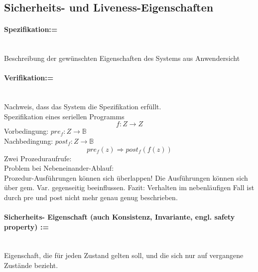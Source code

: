 \documentclass[a4paper,12pt]{scrartcl}
\begin{document}
 \subsection{Sicherheits- und Liveness-Eigenschaften}
 
 \paragraph{Spezifikation:=}\quad\\
 Beschreibung der gewünschten Eigenschaften des Systems aus Anwendersicht
 
 \paragraph{Verifikation:=}\quad\\
 Nachweis, dass das System die Spezifikation erfüllt.\\
 Spezifikation eines seriellen Programms
 $$f:Z\rightarrow Z$$
 Vorbedingung: $pre_f:Z\rightarrow \mathbb{B}$\\
 Nachbedingung: $post_f:Z\rightarrow \mathbb{B}$\\
 
 
 $$pre_f(z)\Rightarrow post_f(f(z))$$
 Zwei Prozeduraufrufe:\\
 
 Problem bei Nebeneinander-Ablauf:\\
 
 Prozedur-Ausführungen können sich überlappen! Die Ausführungen können sich über gem. Var. gegenseitig beeinflussen. Fazit: Verhalten im nebenläufigen Fall ist durch pre und post nicht mehr genau genug beschrieben.\\
 \paragraph{Sicherheits- Eigenschaft (auch Konsistenz, Invariante, engl. safety property) :=}\quad\\
 Eigenschaft, die für jeden Zustand gelten soll, und die sich nur auf vergangene Zustände bezieht.
 
\end{document}
